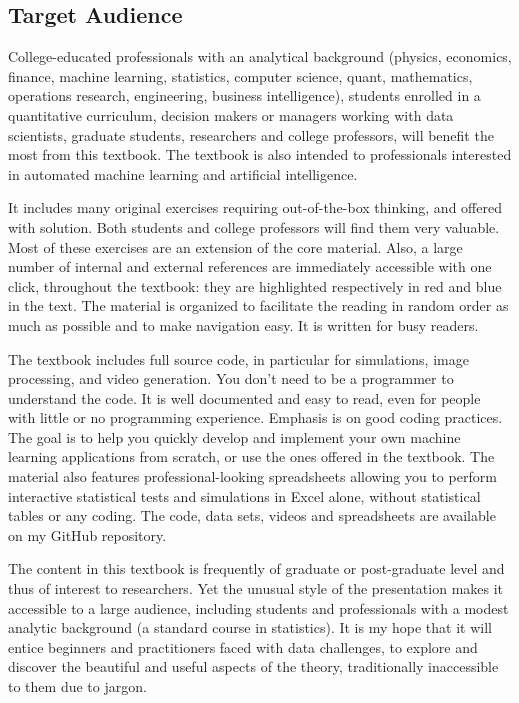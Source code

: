 \documentclass[10pt]{article}
\begin{document}
\subsection*{Target Audience}

College-educated professionals with an analytical background (physics, economics, finance, machine learning, statistics, computer science, quant, mathematics, operations research, engineering, business intelligence), students enrolled in a quantitative curriculum, decision makers or managers working with data scientists, graduate students, researchers and college professors, will benefit the most from this textbook. The textbook is also intended to professionals interested in automated machine learning and artificial intelligence.

It includes many original exercises requiring out-of-the-box thinking, and offered with solution. Both students and college professors will find them very valuable. Most of these exercises are an extension  of the core material.  Also, a large number of internal and external references are immediately accessible with one click, throughout the textbook: they are highlighted respectively in red and blue in the text. The material is organized to facilitate the reading in random order as much as possible and to make navigation easy. It is written for busy readers.

The textbook includes full source code, in particular for simulations, image processing, and video generation. You don't need to be a programmer to understand the code. It is well documented and easy to read, even for people with little or no programming experience. Emphasis is on good coding practices. The goal is to help you quickly  develop and implement your own machine learning applications from scratch, or use the ones offered in the textbook.
The material also features professional-looking spreadsheets allowing you to perform interactive statistical tests and simulations in Excel alone, without statistical tables or any coding.
The code, data sets, videos and spreadsheets are available on my GitHub repository.

The content in this textbook is frequently of graduate or post-graduate level and thus of interest to researchers. Yet the unusual style of the presentation makes it accessible to a large audience, including students and professionals with a modest analytic background (a standard course in statistics). It is my hope that it will entice beginners and practitioners faced with data challenges, to explore and discover the beautiful and useful aspects of the theory, traditionally inaccessible to them due to jargon.
\end{document}
